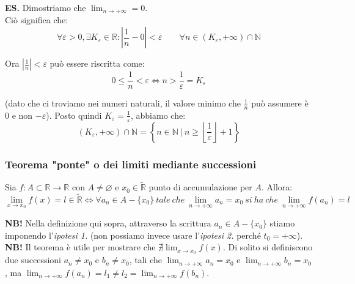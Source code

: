 \documentclass{article}
\begin{document}
\noindent\textbf{ES.} Dimostriamo che $\lim_{n \to +\infty} = 0$.\\
Ciò significa che:
\begin{equation*}
    \forall \varepsilon > 0, \exists K_\varepsilon \in \mathbb{R} : \left|\frac{1}{n} - 0\right| < \varepsilon \qquad \forall n \in (K_\varepsilon, +\infty) \cap \mathbb{N}
\end{equation*}

\noindent Ora $|\frac{1}{n}| < \varepsilon$ può essere riscritta come:
\begin{equation*}
    0 \leq \frac{1}{n} < \varepsilon \iff n > \frac{1}{\varepsilon} = K_\varepsilon
\end{equation*}

\noindent (dato che ci troviamo nei numeri naturali, il valore minimo che $\frac{1}{n}$ può assumere è $0$ e non $-\varepsilon$). Posto quindi $K_\varepsilon = \frac{1}{\varepsilon}$, abbiamo che:
\begin{equation*}
    (K_\varepsilon, +\infty) \cap \mathbb{N} = \left\{n \in \mathbb{N} \ | \ n \geq \left\lfloor \frac{1}{\varepsilon} \right\rfloor + 1\right\}
\end{equation*}

\subsubsection{Teorema "ponte" o dei limiti mediante successioni}
Sia $f: A \subset \mathbb{R} \xrightarrow{} \mathbb{R}$ con $A \neq \varnothing$ e $x_0 \in \widetilde{\mathbb{R}}$ punto di accumulazione per $A$. Allora:
\begin{equation*}
    \lim_{x \to x_0} f(x) = l \in \widetilde{\mathbb{R}} \iff \forall a_n \in A - \{x_0\} \ tale \ che \ \lim_{n \to +\infty} a_n = x_0 \ si \ ha \ che \ \lim_{n \to +\infty} f(a_n) = l
\end{equation*}

\noindent\textbf{NB!} Nella definizione qui sopra, attraverso la scrittura $a_n \in A - \{x_0\}$ stiamo imponendo l'\textit{ipotesi 1.} (non possiamo invece usare l'\textit{ipotesi 2.} perché $t_0 = +\infty$).\\

\noindent\textbf{NB!} Il teorema è utile per mostrare che $\nexists \lim_{x \to x_0} f(x)$. Di solito si definiscono due successioni $a_n \neq x_0$ e $b_n \neq x_0$, tali che $\lim_{n \to +\infty} a_n = x_0$ e $\lim_{n \to +\infty} b_n = x_0$, ma $\lim_{n \to +\infty} f(a_n) = l_1 \neq l_2 = \lim_{n \to +\infty} f(b_n)$.\\
\end{document}
